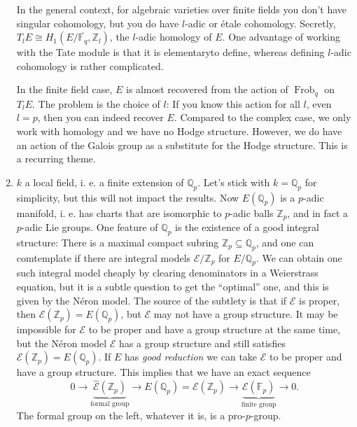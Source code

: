 \begin{enumerate}
  In the general context, for algebraic varieties over finite fields you don't have singular cohomology, but you do have \( l \)-adic or \'etale cohomology.
  Secretly, \( T_l E \cong H_1 \left( E/ \overline{\mathbb{F}_q}, \mathbb{Z}_l \right) \), the \( l \)-adic homology of \( E \).
  One advantage of working with the Tate module is that it is elementaryto define, whereas defining \( l \)-adic cohomology is rather complicated.

  In the finite field case, \( E \) is almost recovered from the action of \( \operatorname{Frob}_q \) on \( T_l E \).
  The problem is the choice of \( l \): If you know this action for all \( l \), even \( l = p \), then you can indeed recover \( E \).
  Compared to the complex case, we only work with homology and we have no Hodge structure.
  However, we do have an action of the Galois group as a substitute for the Hodge structure.
  This is a recurring theme.
\item \( k \) a local field, i. e. a finite extension of \( \mathbb{Q}_p \).
  Let's stick with \( k = \mathbb{Q}_p \) for simplicity, but this will not impact the results.
  Now \( E(\mathbb{Q}_p) \) is a \( p \)-adic manifold, i. e. has charts that are isomorphic to \( p \)-adic balls \( \mathbb{Z}_p \), and in fact a \( p \)-adic Lie groups.
  One feature of \( \mathbb{Q}_p \) is the existence of a good integral structure: There is a maximal compact subring \( \mathbb{Z}_p \subseteq \mathbb{Q}_p \), and one can comtemplate if there are integral models \( \mathcal{E} / \mathbb{Z}_p \) for \( E / \mathbb{Q}_p \).
  We can obtain one such integral model cheaply by clearing denominators in a Weierstrass equation, but it is a subtle question to get the ``optimal'' one, and this is given by the N\'eron model.
  The source of the subtlety is that if \( \mathcal{E} \) is proper, then \( \mathcal{E}( \mathbb{Z}_p ) = E(\mathbb{Q}_p) \), but \( \mathcal{E} \) may not have a group structure.
  It may be impossible for \( \mathcal{E} \) to be proper and have a group structure at the same time, but the N\'eron model \( \mathcal{E} \) has a group structure and still satisfies \( \mathcal{E}( \mathbb{Z}_p ) = E(\mathbb{Q}_p) \).
  If \( E \) has \textit{good reduction} we can take \( \mathcal{E} \) to be proper and have a group structure.
  This implies that we have an exact sequence
  \[ 0 \to \underbrace{\hat{\mathcal{E}}(\mathbb{Z}_p)}_{\text{formal group}} \to E(\mathbb{Q}_p) = \mathcal{E}(\mathbb{Z}_p) \to \underbrace{\mathcal{E}(\mathbb{F}_p)}_{\text{finite group}} \to 0 . \]
  The formal group on the left, whatever it is, is a pro-\( p \)-group.

\end{enumerate}
